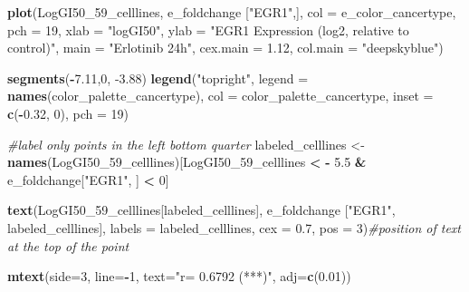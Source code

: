 \documentclass[]{article}
\newenvironment{Shaded}{\begin{snugshade}}{\end{snugshade}}
\newcommand{\CommentTok}[1]{\textcolor[rgb]{0.56,0.35,0.01}{\textit{#1}}}
\newcommand{\DataTypeTok}[1]{\textcolor[rgb]{0.13,0.29,0.53}{#1}}
\newcommand{\DecValTok}[1]{\textcolor[rgb]{0.00,0.00,0.81}{#1}}
\newcommand{\FloatTok}[1]{\textcolor[rgb]{0.00,0.00,0.81}{#1}}
\newcommand{\KeywordTok}[1]{\textcolor[rgb]{0.13,0.29,0.53}{\textbf{#1}}}
\newcommand{\NormalTok}[1]{#1}
\newcommand{\OperatorTok}[1]{\textcolor[rgb]{0.81,0.36,0.00}{\textbf{#1}}}
\newcommand{\StringTok}[1]{\textcolor[rgb]{0.31,0.60,0.02}{#1}}
\begin{document}
\begin{Shaded}
\begin{Highlighting}[]
\KeywordTok{plot}\NormalTok{(LogGI50_}\DecValTok{59}\NormalTok{_celllines, e_foldchange [}\StringTok{"EGR1"}\NormalTok{,], }
     \DataTypeTok{col =}\NormalTok{ e_color_cancertype, }
     \DataTypeTok{pch =} \DecValTok{19}\NormalTok{, }
     \DataTypeTok{xlab =} \StringTok{"logGI50"}\NormalTok{, }
     \DataTypeTok{ylab =} \StringTok{"EGR1 Expression (log2, relative to control)"}\NormalTok{,        }
     \DataTypeTok{main =} \StringTok{"Erlotinib 24h"}\NormalTok{, }
     \DataTypeTok{cex.main =} \FloatTok{1.12}\NormalTok{, }
     \DataTypeTok{col.main =} \StringTok{"deepskyblue"}\NormalTok{)}

\KeywordTok{segments}\NormalTok{(}\OperatorTok{-}\FloatTok{7.11}\NormalTok{,}\DecValTok{0}\NormalTok{, }\FloatTok{-3.88}\NormalTok{)}
\KeywordTok{legend}\NormalTok{(}\StringTok{"topright"}\NormalTok{, }
       \DataTypeTok{legend =} \KeywordTok{names}\NormalTok{(color_palette_cancertype), }
       \DataTypeTok{col =}\NormalTok{ color_palette_cancertype, }
       \DataTypeTok{inset =} \KeywordTok{c}\NormalTok{(}\OperatorTok{-}\FloatTok{0.32}\NormalTok{, }\DecValTok{0}\NormalTok{),}
       \DataTypeTok{pch =} \DecValTok{19}\NormalTok{)}


\CommentTok{#label only points in the left bottom quarter}
\NormalTok{labeled_celllines <-}\StringTok{ }\KeywordTok{names}\NormalTok{(LogGI50_}\DecValTok{59}\NormalTok{_celllines)[LogGI50_}\DecValTok{59}\NormalTok{_celllines }\OperatorTok{<}\StringTok{ }\OperatorTok{-}\StringTok{ }\FloatTok{5.5}
                                                        \OperatorTok{&}\StringTok{ }\NormalTok{e_foldchange[}\StringTok{"EGR1"}\NormalTok{, ] }\OperatorTok{<}\StringTok{ }\DecValTok{0}\NormalTok{]}

\KeywordTok{text}\NormalTok{(LogGI50_}\DecValTok{59}\NormalTok{_celllines[labeled_celllines], e_foldchange [}\StringTok{"EGR1"}\NormalTok{, labeled_celllines], }
     \DataTypeTok{labels =}\NormalTok{ labeled_celllines,}
     \DataTypeTok{cex =} \FloatTok{0.7}\NormalTok{,}
     \DataTypeTok{pos =} \DecValTok{3}\NormalTok{)}\CommentTok{#position of text at the top of the point}

\KeywordTok{mtext}\NormalTok{(}\DataTypeTok{side=}\DecValTok{3}\NormalTok{, }\DataTypeTok{line=}\OperatorTok{-}\DecValTok{1}\NormalTok{, }\DataTypeTok{text=}\StringTok{"r= 0.6792 (***)"}\NormalTok{, }\DataTypeTok{adj=}\KeywordTok{c}\NormalTok{(}\FloatTok{0.01}\NormalTok{))}
\end{Highlighting}
\end{Shaded}
\end{document}
